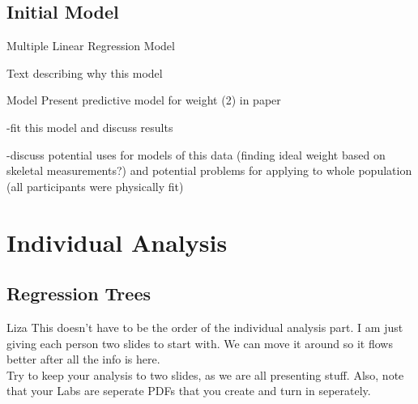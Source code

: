 \documentclass[table]{beamer}
\begin{document}

\subsection{Initial Model}


\begin{frame}{Multiple Linear Regression Model}

Text describing why this model

\begin{block}{Model}
Present predictive model for weight (2) in paper

-fit this model and discuss results

-discuss potential uses for models of this data (finding ideal weight based on skeletal measurements?) and potential problems for applying to whole population (all participants were physically fit)
\end{block}


\end{frame}



\section{Individual Analysis}


\subsection{Regression Trees}


\begin{frame}{Liza}
This doesn't have to be the order of the individual analysis part. I am just giving each person two slides to start with. We can move it around so it flows better after all the info is here. \\

Try to keep your analysis to two slides, as we are all presenting stuff. Also, note that your Labs are seperate PDFs that you create and turn in seperately.

\end{frame}

\end{document}
